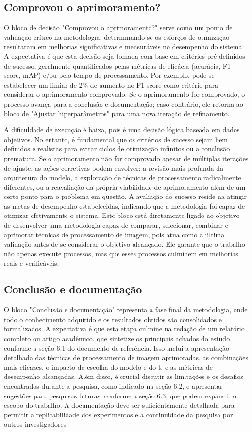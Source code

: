 \subsection{Comprovou o aprimoramento?}
O bloco de decisão "Comprovou o aprimoramento?" serve como um ponto de validação crítico na metodologia, determinando se os esforços de otimização resultaram em melhorias significativas e mensuráveis no desempenho do sistema. A expectativa é que esta decisão seja tomada com base em critérios pré-definidos de sucesso, geralmente quantificados pelas métricas de eficácia (acurácia, F1-score, mAP) e/ou pelo tempo de processamento. Por exemplo, pode-se estabelecer um limiar de 2\% de aumento no F1-score como critério para considerar o aprimoramento comprovado. Se o aprimoramento for comprovado, o processo avança para a conclusão e documentação; caso contrário, ele retorna ao bloco de "Ajustar hiperparâmetros" para uma nova iteração de refinamento.

A dificuldade de execução é baixa, pois é uma decisão lógica baseada em dados objetivos. No entanto, é fundamental que os critérios de sucesso sejam bem definidos e realistas para evitar ciclos de otimização infinitos ou a conclusão prematura. Se o aprimoramento não for comprovado apesar de múltiplas iterações de ajuste, as ações corretivas podem envolver: a revisão mais profunda da arquitetura do modelo, a exploração de técnicas de processamento radicalmente diferentes, ou a reavaliação da própria viabilidade de aprimoramento além de um certo ponto para o problema em questão. A avaliação do sucesso reside na atingir as metas de desempenho estabelecidas, indicando que a metodologia foi capaz de otimizar efetivamente o sistema. Este bloco está diretamente ligado ao objetivo de desenvolver uma metodologia capaz de comparar, selecionar, combinar e aprimorar técnicas de processamento de imagem, pois atua como a última validação antes de se considerar o objetivo alcançado. Ele garante que o trabalho não apenas execute processos, mas que esses processos culminem em melhorias reais e verificáveis.

\subsection{Conclusão e documentação}
O bloco "Conclusão e documentação" representa a fase final da metodologia, onde todo o conhecimento adquirido e os resultados obtidos são consolidados e formalizados. A expectativa é que esta etapa culmine na redação de um relatório completo ou artigo acadêmico, que sintetize os principais achados do estudo, conforme a seção 6.1 do documento de referência. Isso inclui a apresentação detalhada das técnicas de processamento de imagem aprimoradas, as combinações mais eficazes, o impacto da escolha do modelo e do t, e as métricas de desempenho alcançadas. Além disso, é crucial discutir as limitações e os desafios encontrados durante a pesquisa, como indicado na seção 6.2, e apresentar sugestões para pesquisas futuras, conforme a seção 6.3, que podem expandir o escopo do trabalho. A documentação deve ser suficientemente detalhada para permitir a replicabilidade dos experimentos e a continuidade da pesquisa por outros investigadores.

